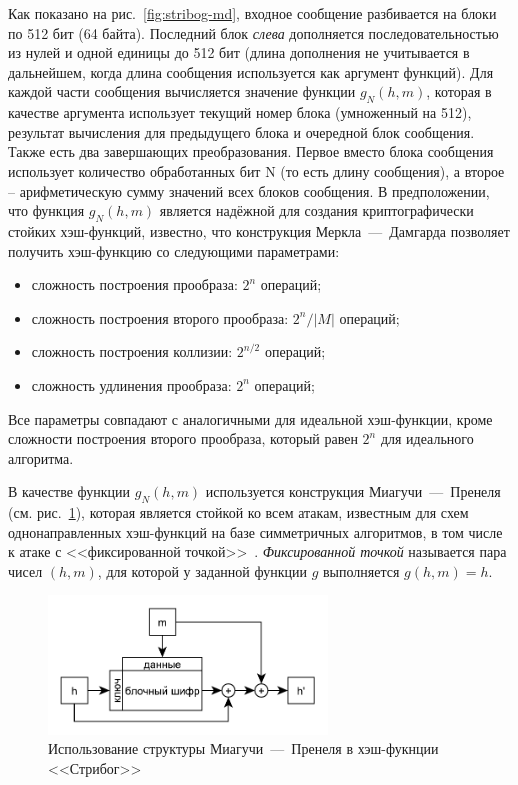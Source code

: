 Как показано на рис.~\ref{fig:stribog-md}, входное сообщение разбивается на блоки по 512 бит (64 байта). Последний блок \emph{слева} дополняется последовательностью из нулей и  одной единицы до 512 бит (длина дополнения не учитывается в дальнейшем, когда длина сообщения используется как аргумент функций). Для каждой части сообщения вычисляется значение функции $g_N(h, m)$, которая в качестве аргумента использует текущий номер блока (умноженный на 512), результат вычисления для предыдущего блока и очередной блок сообщения. Также есть два завершающих преобразования. Первое вместо блока сообщения использует количество обработанных бит N (то есть длину сообщения), а второе -- арифметическую сумму значений всех блоков сообщения. В предположении, что функция $g_N(h, m)$ является надёжной для создания криптографически стойких хэш-функций, известно, что конструкция Меркла~---~Дамгарда позволяет получить хэш-функцию со следующими параметрами:

\begin{itemize}
	\item сложность построения прообраза: $2^n$ операций;
	\item сложность построения второго прообраза: $2^n / \left|M\right|$ операций;
	\item сложность построения коллизии: $2^{n/2}$ операций;
	\item сложность удлинения прообраза: $2^n$ операций;
\end{itemize}

Все параметры совпадают с аналогичными для идеальной хэш-функции, кроме сложности построения второго прообраза, который равен $2^n$ для идеального алгоритма.

В качестве функции $g_N(h, m)$ используется конструкция Миагучи~---~Пренеля (см. рис.~\ref{fig:stribog-mp}), которая является стойкой ко всем атакам, известным для схем однонаправленных хэш-функций на базе симметричных алгоритмов, в том числе к атаке с <<фиксированной точкой>>~\cite[стр. 502]{Schneier:2002}. \emph{Фиксированной точкой} называется пара чисел $(h, m)$, для которой у заданной функции $g$ выполняется $g(h, m) = h$.

\begin{figure}[htb]
	\centering
	\includegraphics[width=0.66\textwidth]{pic/stribog-mp}
  \caption{Использование структуры Миагучи~---~Пренеля в хэш-фукнции <<Стрибог>>}
  \label{fig:stribog-mp}
\end{figure}

